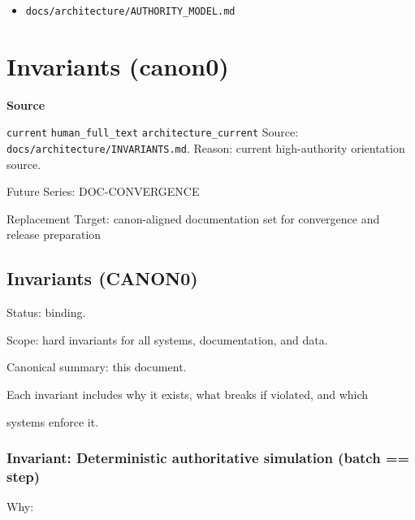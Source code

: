 \documentclass[9pt,a4paper,openany]{book}
\newcommand{\vonecallout}[3]{\par\medskip\noindent\begingroup\setlength{\fboxsep}{7pt}\colorbox{DomCalloutBg}{\parbox{0.94\linewidth}{\textbf{\textcolor{#1}{#2}}\par #3}}\endgroup\par\medskip}
\begin{document}
\begin{itemize}
\item \texttt{docs/\allowbreak{}architecture/\allowbreak{}AUTHORITY\_\allowbreak{}MODEL.\allowbreak{}md}
\end{itemize}



\section{Invariants (canon0)}

\vonecallout{DomSlate}{Source}{\texttt{current} \texttt{human\_\allowbreak{}full\_\allowbreak{}text} \texttt{architecture\_\allowbreak{}current} Source: \texttt{docs/\allowbreak{}architecture/\allowbreak{}INVARIANTS.\allowbreak{}md}.\allowbreak{} Reason: current high-\allowbreak{}authority orientation source.\allowbreak{}}

Future Series: DOC-\allowbreak{}CONVERGENCE

Replacement Target: canon-\allowbreak{}aligned documentation set for convergence and release preparation


\subsection{Invariants (CANON0)}





Status: binding.\allowbreak{}



Scope: hard invariants for all systems, documentation, and data.\allowbreak{}






Canonical summary: this document.\allowbreak{}






Each invariant includes why it exists, what breaks if violated, and which



systems enforce it.\allowbreak{}






\subsubsection{Invariant: Deterministic authoritative simulation (batch == step)}


Why:
\end{document}
